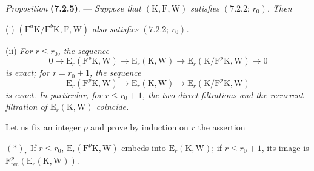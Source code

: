 \documentclass[11pt,leqno]{article}
\begin{document}
\textit{Proposition} \textbf{(7.2.5)}. — \textit{Suppose that \((\mathrm{K},\mathrm{F},\mathrm{W})\) satisfies \((7.2.2;\,r_0)\). Then}

\noindent
(i) \textit{\((\mathrm{F}^a\mathrm{K}/\mathrm{F}^b\mathrm{K},\mathrm{F},\mathrm{W})\) also satisfies \((7.2.2;\,r_0)\).}

\noindent
(ii) \textit{For \(r\leq r_0\), the sequence}
\[
0\to\mathrm{E}_r(\mathrm{F}^p\mathrm{K},\mathrm{W})
\to\mathrm{E}_r(\mathrm{K},\mathrm{W})
\to\mathrm{E}_r(\mathrm{K}/\mathrm{F}^p\mathrm{K},\mathrm{W})\to 0
\]
\textit{is exact; for \(r=r_0+1\), the sequence}
\[
\mathrm{E}_r(\mathrm{F}^p\mathrm{K},\mathrm{W})
\to\mathrm{E}_r(\mathrm{K},\mathrm{W})
\to\mathrm{E}_r(\mathrm{K}/\mathrm{F}^p\mathrm{K},\mathrm{W})
\]
\textit{is exact. In particular, for \(r\leq r_0+1\), the two direct filtrations and the recurrent filtration of \(\mathrm{E}_r(\mathrm{K},\mathrm{W})\) coincide.}

Let us fix an integer \(p\) and prove by induction on \(r\) the assertion

\((\ast)_r\) If \(r\leq r_0\), \(\mathrm{E}_r(\mathrm{F}^p\mathrm{K},\mathrm{W})\) embeds into \(\mathrm{E}_r(\mathrm{K},\mathrm{W})\); if \(r\leq r_0+1\), its image is \(\mathrm{F}_{\mathrm{rec}}^p(\mathrm{E}_r(\mathrm{K},\mathrm{W}))\).
\end{document}
